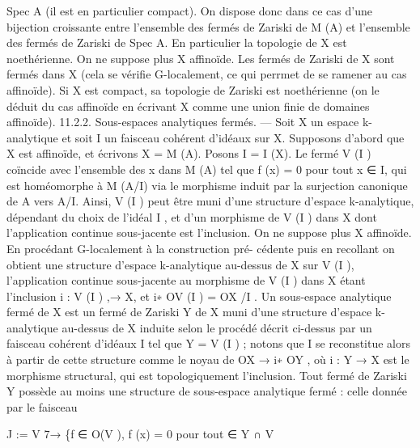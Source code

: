 \documentclass[
  10pt,
]{article}
\newenvironment{Shaded}{}{}
\newcommand{\NormalTok}[1]{#1}
\begin{document}
\begin{Shaded}
\begin{Highlighting}[]
\NormalTok{Spec A (il est en particulier compact). On dispose donc dans ce cas d’une bijection}
\NormalTok{croissante entre l’ensemble des fermés de Zariski de M (A) et l’ensemble des fermés de}
\NormalTok{Zariski de Spec A. En particulier la topologie de X est noethérienne.}
\NormalTok{  On ne suppose plus X affinoïde. Les fermés de Zariski de X sont fermés dans X (cela se}
\NormalTok{vérifie G{-}localement, ce qui perrmet de se ramener au cas affinoïde). Si X est compact,}
\NormalTok{sa topologie de Zariski est noethérienne (on le déduit du cas affinoïde en écrivant X}
\NormalTok{comme une union finie de domaines affinoïde).}
\NormalTok{11.2.2. Sous{-}espaces analytiques fermés. — Soit X un espace k{-}analytique et soit}
\NormalTok{I un faisceau cohérent d’idéaux sur X. Supposons d’abord que X est affinoïde, et}
\NormalTok{écrivons X = M (A). Posons I = I (X). Le fermé V (I ) coïncide avec l’ensemble des}
\NormalTok{x dans M (A) tel que f (x) = 0 pour tout x ∈ I, qui est homéomorphe à M (A/I) via}
\NormalTok{le morphisme induit par la surjection canonique de A vers A/I. Ainsi, V (I ) peut être}
\NormalTok{muni d’une structure d’espace k{-}analytique, dépendant du choix de l’idéal I , et d’un}
\NormalTok{morphisme de V (I ) dans X dont l’application continue sous{-}jacente est l’inclusion.}
\NormalTok{   On ne suppose plus X affinoïde. En procédant G{-}localement à la construction pré{-}}
\NormalTok{cédente puis en recollant on obtient une structure d’espace k{-}analytique au{-}dessus de}
\NormalTok{X sur V (I ), l’application continue sous{-}jacente au morphisme de V (I ) dans X étant}
\NormalTok{l’inclusion i : V (I ) ,→ X, et i∗ OV (I ) = OX /I .}
\NormalTok{   Un sous{-}espace analytique fermé de X est un fermé de Zariski Y de X muni d’une}
\NormalTok{structure d’espace k{-}analytique au{-}dessus de X induite selon le procédé décrit ci{-}dessus}
\NormalTok{par un faisceau cohérent d’idéaux I tel que Y = V (I ) ; notons que I se reconstitue}
\NormalTok{alors à partir de cette structure comme le noyau de OX → i∗ OY , où i : Y → X est le}
\NormalTok{morphisme structural, qui est topologiquement l’inclusion.}
\NormalTok{   Tout fermé de Zariski Y possède au moins une structure de sous{-}espace analytique}
\NormalTok{fermé : celle donnée par le faisceau}

\NormalTok{                 J := V 7→ \{f ∈ O(V ), f (x) = 0 pour tout ∈ Y ∩ V}


\end{Highlighting}
\end{Shaded}
\end{document}

